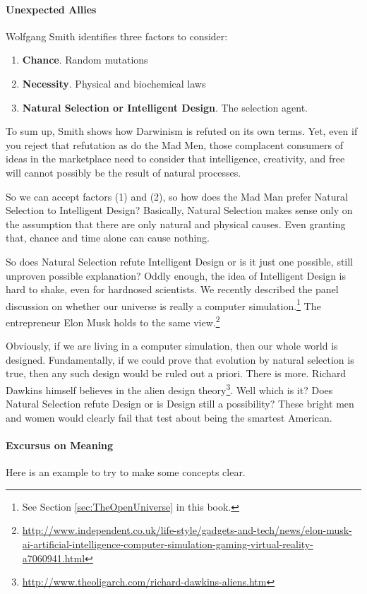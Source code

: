 \paragraph{Unexpected Allies}
Wolfgang Smith identifies three factors to consider:

\begin{enumerate}
\item \textbf{Chance}. Random mutations 
\item \textbf{Necessity}. Physical and biochemical laws 
\item \textbf{Natural Selection or Intelligent Design}. The selection agent. 
\end{enumerate}
To sum up, Smith shows how Darwinism is refuted on its own terms. Yet, even if you reject that refutation as do the Mad Men, those complacent consumers of ideas in the marketplace need to consider that intelligence, creativity, and free will cannot possibly be the result of natural processes.

So we can accept factors (1) and (2), so how does the Mad Man prefer Natural Selection to Intelligent Design? Basically, Natural Selection makes sense only on the assumption that there are only natural and physical causes. Even granting that, chance and time alone can cause nothing.

So does Natural Selection refute Intelligent Design or is it just one possible, still unproven possible explanation? Oddly enough, the idea of Intelligent Design is hard to shake, even for hardnosed scientists. We recently described the panel discussion on whether our universe is really a computer simulation.\footnote{See Section \ref{sec:TheOpenUniverse} in this book.} The entrepreneur Elon Musk holds to the same view.\footnote{\url{http://www.independent.co.uk/life-style/gadgets-and-tech/news/elon-musk-ai-artificial-intelligence-computer-simulation-gaming-virtual-reality-a7060941.html}}

Obviously, if we are living in a computer simulation, then our whole world is designed. Fundamentally, if we could prove that evolution by natural selection is true, then any such design would be ruled out a priori. There is more. Richard Dawkins himself believes in the alien design theory\footnote{\url{http://www.theoligarch.com/richard-dawkins-aliens.htm}}. Well which is it? Does Natural Selection refute Design or is Design still a possibility? These bright men and women would clearly fail that test about being the smartest American.

\paragraph{Excursus on Meaning}
Here is an example to try to make some concepts clear.

